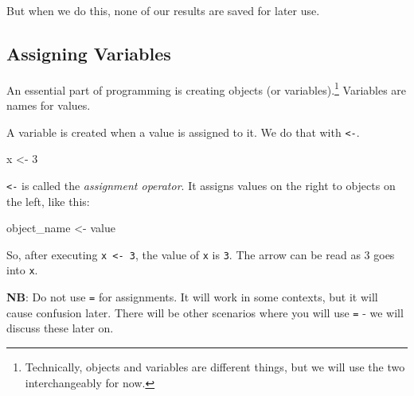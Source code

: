 \documentclass[]{book}
\newenvironment{Shaded}{\begin{snugshade}}{\end{snugshade}}
\newcommand{\DecValTok}[1]{\textcolor[rgb]{0.00,0.00,0.81}{#1}}
\newcommand{\StringTok}[1]{\textcolor[rgb]{0.31,0.60,0.02}{#1}}
\newcommand{\CommentTok}[1]{\textcolor[rgb]{0.56,0.35,0.01}{\textit{#1}}}
\newcommand{\OperatorTok}[1]{\textcolor[rgb]{0.81,0.36,0.00}{\textbf{#1}}}
\newcommand{\NormalTok}[1]{#1}
\begin{document}
\begin{Shaded}
\end{Shaded}

But when we do this, none of our results are saved for later use.

\subsection{Assigning Variables}\label{assigning-variables}

An essential part of programming is creating objects (or
variables).\footnote{Technically, objects and variables are different
  things, but we will use the two interchangeably for now.} Variables
are names for values.

A variable is created when a value is assigned to it. We do that with
\texttt{\textless{}-}.

\begin{Shaded}
\begin{Highlighting}[]
\NormalTok{x <-}\StringTok{ }\DecValTok{3}
\end{Highlighting}
\end{Shaded}

\texttt{\textless{}-} is called the \emph{assignment operator}. It
assigns values on the right to objects on the left, like this:

\begin{Shaded}
\begin{Highlighting}[]
\NormalTok{object_name <-}\StringTok{ }\NormalTok{value}
\end{Highlighting}
\end{Shaded}

So, after executing \texttt{x\ \textless{}-\ 3}, the value of \texttt{x}
is \texttt{3}. The arrow can be read as 3 goes into \texttt{x}.

\textbf{NB}: Do not use \texttt{=} for assignments. It will work in some
contexts, but it will cause confusion later. There will be other
scenarios where you will use \texttt{=} - we will discuss these later
on.
\end{document}
